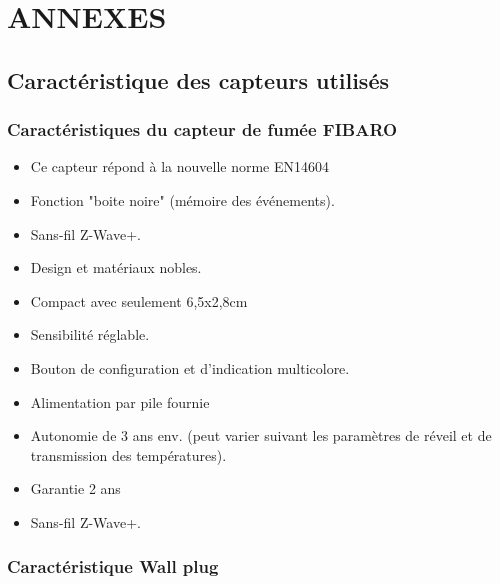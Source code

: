 \newpage
\chapter{ANNEXES}
\listoffigures
\newpage

\section{Caractéristique des capteurs utilisés}
\subsection{Caractéristiques du capteur de fumée FIBARO}

\begin{itemize}

\item Ce capteur répond à la nouvelle norme EN14604


\item Fonction "boite noire" (mémoire des événements).


\item Sans-fil Z-Wave+.


\item Design et matériaux nobles.


\item Compact avec seulement 6,5x2,8cm


\item Sensibilité réglable.


\item Bouton de configuration et d'indication multicolore.


\item Alimentation par pile fournie 


\item Autonomie de 3 ans env. (peut varier suivant les paramètres de réveil et de transmission des températures).


\item Garantie 2 ans


\item Sans-fil Z-Wave+.
\end{itemize}
\subsection{Caractéristique Wall plug}

